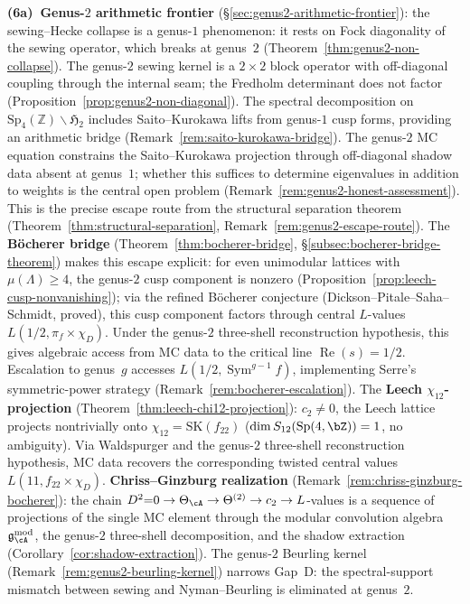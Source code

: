 \smallskip\noindent
\textbf{(6a)~Genus-$2$ arithmetic frontier}
(\S\ref{sec:genus2-arithmetic-frontier}):
the sewing--Hecke collapse is a genus-$1$ phenomenon: it
rests on Fock diagonality of the sewing operator, which
breaks at genus~$2$
(Theorem~\ref{thm:genus2-non-collapse}).
The genus-$2$ sewing kernel is a $2 \times 2$ block operator
with off-diagonal coupling through the internal seam; the
Fredholm determinant does not factor
(Proposition~\ref{prop:genus2-non-diagonal}).
The spectral decomposition on
$\mathrm{Sp}_4(\mathbb{Z})\backslash\mathfrak{H}_2$
includes Saito--Kurokawa lifts from genus-$1$ cusp forms,
providing an arithmetic bridge
(Remark~\ref{rem:saito-kurokawa-bridge}).
The genus-$2$ MC equation constrains the Saito--Kurokawa
projection through off-diagonal shadow data absent at
genus~$1$; whether this suffices to determine eigenvalues
in addition to weights is the central open problem
(Remark~\ref{rem:genus2-honest-assessment}).
This is the precise escape route from the structural
separation theorem
(Theorem~\ref{thm:structural-separation},
Remark~\ref{rem:genus2-escape-route}).
The \textbf{B\"ocherer bridge}
(Theorem~\ref{thm:bocherer-bridge},
\S\ref{subsec:bocherer-bridge-theorem})
makes this escape explicit: for even unimodular lattices
with $\mu(\Lambda) \geq 4$, the genus-$2$ cusp component
is nonzero
(Proposition~\ref{prop:leech-cusp-nonvanishing});
via the refined B\"ocherer conjecture
(Dickson--Pitale--Saha--Schmidt, proved),
this cusp component factors through central $L$-values
$L(1/2, \pi_f \times \chi_D)$. Under the genus-$2$ three-shell
reconstruction hypothesis, this gives algebraic access from MC data
to the critical line
$\operatorname{Re}(s) = 1/2$.
Escalation to genus~$g$ accesses
$L(1/2, \operatorname{Sym}^{g-1} f)$, implementing
Serre's symmetric-power strategy
(Remark~\ref{rem:bocherer-escalation}).
The \textbf{Leech $\chi_{12}$-projection}
(Theorem~\ref{thm:leech-chi12-projection}):
$c_2 \neq 0$, the Leech lattice projects nontrivially
onto $\chi_{12} = \mathrm{SK}(f_{22})$
($\dim S_{12}(\mathrm{Sp}(4,\bZ)) = 1$, no ambiguity).
Via Waldspurger and the genus-$2$ three-shell reconstruction
hypothesis, MC data recovers the corresponding twisted central
values $L(11, f_{22} \times \chi_D)$.
\textbf{Chriss--Ginzburg realization}
(Remark~\ref{rem:chriss-ginzburg-bocherer}):
the chain $D^2{=}0 \to \Theta_\cA \to \Theta^{(2)}
\to c_2 \to L$-values is a sequence of projections
of the single MC element through the modular convolution
algebra $\mathfrak{g}_\cA^{\mathrm{mod}}$,
the genus-$2$ three-shell decomposition, and the
shadow extraction (Corollary~\ref{cor:shadow-extraction}).
The genus-$2$ Beurling kernel
(Remark~\ref{rem:genus2-beurling-kernel})
narrows Gap~D: the spectral-support mismatch between
sewing and Nyman--Beurling is eliminated at genus~$2$.

